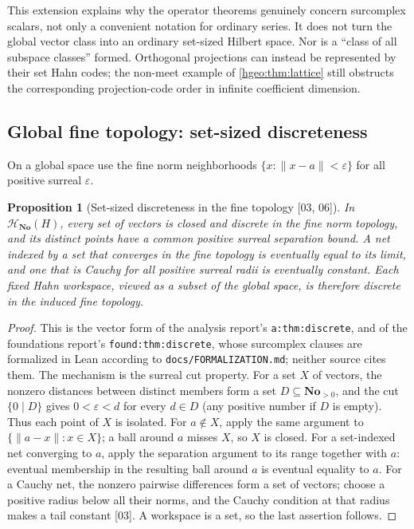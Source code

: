\documentclass[11pt,letterpaper]{article}
\numberwithin{equation}{section}
\newtheorem{proposition}[proposition]{Proposition}
\theoremstyle{definition}
\theoremstyle{remark}
\newcommand{\No}{\mathbf{No}}
\newcommand{\norm}[1]{\lVert #1\rVert}
\newcommand{\src}[1]{\textup{\textsf{\small[#1]}}}
\newcommand{\replabel}[1]{\nolinkurl{#1}}
\newcommand{\fn}[1]{\nolinkurl{#1}}
\begin{document}
This extension explains why the operator theorems genuinely concern
surcomplex scalars, not only a convenient notation for ordinary
series. It does not turn the global vector class into an ordinary
set-sized Hilbert space. Nor is a ``class of all subspace
classes'' formed. Orthogonal projections can instead be represented by
their set Hahn codes; the non-meet example of
\cref{hgeo:thm:lattice} still obstructs the corresponding
projection-code order in infinite coefficient dimension.

\subsection{Global fine topology: set-sized discreteness}
On a global space use the fine norm neighborhoods
$\{x:\norm{x-a}<\varepsilon\}$ for all positive surreal $\varepsilon$.

\begin{proposition}[Set-sized discreteness in the fine topology
\src{03, 06}]\label{hgeo:prop:globalnets}
In $\mathscr H_{\No}(H)$, every set of vectors is closed and discrete in the
fine norm topology, and its distinct points have a common positive surreal
separation bound. A net indexed by a set that converges in the fine topology
is eventually equal to its limit, and one that is Cauchy for \emph{all}
positive surreal radii is eventually constant. Each fixed Hahn workspace,
viewed as a subset of the global space, is therefore discrete in the induced
fine topology.
\end{proposition}
\begin{proof}
This is the vector form of the analysis report's
\replabel{a:thm:discrete}, and of the foundations report's
\replabel{found:thm:discrete}, whose surcomplex clauses are formalized in
Lean according to \fn{docs/FORMALIZATION.md}; neither source cites them. The
mechanism is the surreal cut property. For a set $X$ of vectors, the nonzero
distances between distinct members form a set $D\subseteq\No_{>0}$, and the
cut $\{0\mid D\}$ gives $0<\varepsilon<d$ for every $d\in D$ (any positive
number if $D$ is empty). Thus each point of $X$ is isolated. For $a\notin X$,
apply the same argument to $\{\norm{a-x}:x\in X\}$; a ball around $a$ misses
$X$, so $X$ is closed. For a set-indexed net converging to $a$, apply the
separation argument to its range together with $a$: eventual membership in
the resulting ball around $a$ is eventual equality to $a$. For a Cauchy net,
the nonzero pairwise differences form a set of vectors; choose a positive
radius below all their norms, and the Cauchy condition at that radius makes
a tail constant \src{03}. A workspace is a set, so the last assertion
follows.
\end{proof}
\end{document}
